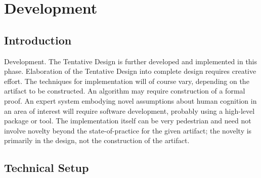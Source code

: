 
\chapter{Development} %

\label{ChapterDevelopment} %


\section{Introduction}

Development. The Tentative Design is further developed and implemented in this phase. Elaboration of the Tentative Design into complete design requires creative effort. The techniques for implementation will of course vary, depending on the artifact to be constructed. An algorithm may require construction of a formal proof. An expert system embodying novel assumptions about human cognition in an area of interest will require software development, probably using a high-level package or tool. The implementation itself can be very pedestrian and need not involve novelty beyond the state-of-practice for the given artifact; the novelty is primarily in the design, not the construction of the artifact.
\cite{Vaishnavi2008}




\section{Technical Setup}




